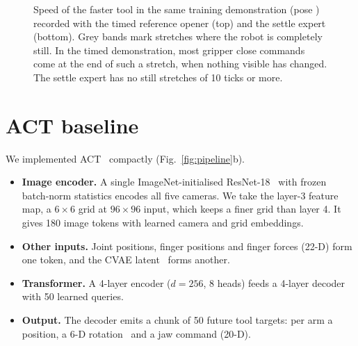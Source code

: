 \documentclass[10pt,twocolumn,letterpaper]{article}
\begin{document}
\begin{figure}[t]
\centering
\def\ymaxtrace{100}
\caption{Speed of the faster tool in the same training demonstration (pose \TracePose) recorded with the timed
reference opener (top) and the settle expert (bottom). Grey bands mark stretches where the robot is completely
still. In the timed demonstration, most gripper close commands come at the end of such a stretch, when nothing
visible has changed. The settle expert has no still stretches of 10 ticks or more.}
\label{fig:idle}
\end{figure}

\section{ACT baseline}\label{sec:act}
We implemented ACT~\cite{act} compactly (Fig.~\ref{fig:pipeline}b).
\begin{itemize}\itemsep0pt
  \item \textbf{Image encoder.} A single ImageNet-initialised ResNet-18~\cite{resnet} with frozen batch-norm
  statistics encodes all five cameras. We take the layer-3 feature map, a $6\times6$ grid at $96\times96$
  input, which keeps a finer grid than layer 4. It gives 180 image tokens with learned camera and grid
  embeddings.
  \item \textbf{Other inputs.} Joint positions, finger positions and finger forces (22-D) form one token, and
  the CVAE latent~\cite{cvae} forms another.
  \item \textbf{Transformer.} A 4-layer encoder ($d=256$, 8 heads) feeds a 4-layer decoder with 50 learned
  queries.
  \item \textbf{Output.} The decoder emits a chunk of 50 future tool targets: per arm a position, a 6-D
  rotation~\cite{rot6d} and a jaw command (20-D).
\end{itemize}
\end{document}
